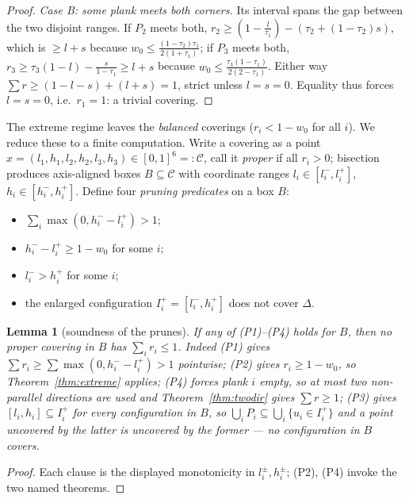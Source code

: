 \documentclass[11pt,reqno]{amsart}
\theoremstyle{plain}
\newtheorem{lemma}[theorem]{Lemma}
\theoremstyle{definition}
\theoremstyle{remark}
\begin{document}
\begin{proof}
\emph{Case B: some plank meets both corners.} Its interval spans the gap
between the two disjoint ranges. If $P_2$ meets both,
$r_2\ge(1-\tfrac l{\tau_1})-(\tau_2+(1-\tau_2)s)$, which is $\ge l+s$ because
$w_0\le\tfrac{(1-\tau_2)\tau_1}{2(1+\tau_1)}$; if $P_3$ meets both,
$r_3\ge\tau_3(1-l)-\tfrac s{1-\tau_1}\ge l+s$ because
$w_0\le\tfrac{\tau_3(1-\tau_1)}{2(2-\tau_1)}$. Either way
$\sum r\ge(1-l-s)+(l+s)=1$, strict unless $l=s=0$. Equality thus forces
$l=s=0$, i.e.\ $r_1=1$: a trivial covering.
\end{proof}

The extreme regime leaves the \emph{balanced} coverings ($r_i<1-w_0$ for all
$i$). We reduce these to a finite computation. Write a covering as a point
$x=(l_1,h_1,l_2,h_2,l_3,h_3)\in[0,1]^6=:\mathcal C$, call it \emph{proper} if
all $r_i>0$; bisection produces axis-aligned boxes $B\subseteq\mathcal C$ with
coordinate ranges $l_i\in[l_i^-,l_i^+]$, $h_i\in[h_i^-,h_i^+]$. Define four
\emph{pruning predicates} on a box $B$:
\begin{itemize}
\item[(P1)] $\sum_i\max(0,h_i^--l_i^+)>1$;
\item[(P2)] $h_i^--l_i^+\ge1-w_0$ for some $i$;
\item[(P4)] $l_i^->h_i^+$ for some $i$;
\item[(P3)] the enlarged configuration $I_i^+=[l_i^-,h_i^+]$ does not cover
$\Delta$.
\end{itemize}

\begin{lemma}[soundness of the prunes]\label{lem:prunes}
If any of \textup{(P1)--(P4)} holds for $B$, then no proper covering in $B$ has
$\sum_i r_i\le1$. Indeed \textup{(P1)} gives $\sum r_i\ge\sum\max(0,h_i^--
l_i^+)>1$ pointwise; \textup{(P2)} gives $r_i\ge1-w_0$, so
Theorem~\ref{thm:extreme} applies; \textup{(P4)} forces plank $i$ empty, so at
most two non-parallel directions are used and Theorem~\ref{thm:twodir} gives
$\sum r\ge1$; \textup{(P3)} gives $[l_i,h_i]\subseteq I_i^+$ for every
configuration in $B$, so $\bigcup_iP_i\subseteq\bigcup_i\{u_i\in I_i^+\}$ and a
point uncovered by the latter is uncovered by the former --- no configuration
in $B$ covers.
\end{lemma}
\begin{proof}
Each clause is the displayed monotonicity in $l_i^\pm,h_i^\pm$; (P2), (P4)
invoke the two named theorems.
\end{proof}
\end{document}
